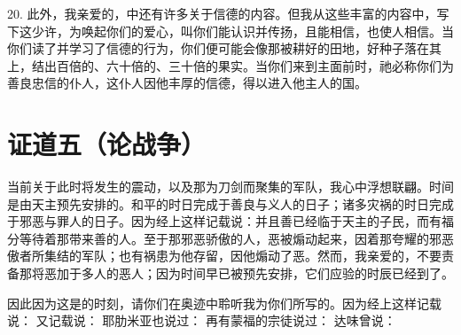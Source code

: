 20. 此外，我亲爱的，中还有许多关于信德的内容。但我从这些丰富的内容中，写下这少许，为唤起你们的爱心，叫你们能认识并传扬，且能相信，也使人相信。当你们读了并学习了信德的行为，你们便可能会像那被耕好的田地，好种子落在其上，结出百倍的、六十倍的、三十倍的果实。当你们来到主面前时，祂必称你们为善良忠信的仆人，这仆人因他丰厚的信德，得以进入他主人的国。\par



\section{证道五（论战争）}

 当前关于此时将发生的震动，以及那为刀剑而聚集的军队，我心中浮想联翩。时间是由天主预先安排的。和平的时日完成于善良与义人的日子；诸多灾祸的时日完成于邪恶与罪人的日子。因为经上这样记载说：并且善已经临于天主的子民，而有福分等待着那带来善的人。至于那邪恶骄傲的人，恶被煽动起来，因着那夸耀的邪恶傲者所集结的军队；也有祸患为他存留，因他煽动了恶。然而，我亲爱的，不要责备那将恶加于多人的恶人；因为时间早已被预先安排，它们应验的时辰已经到了。\par

 因此因为这是的时刻，请你们在奥迹中聆听我为你们所写的。因为经上这样记载说： 又记载说： 耶肋米亚也说过： 再有蒙福的宗徒说过： 达味曾说：\par

